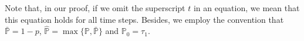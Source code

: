 %
%
Note that, in our proof, if we omit the superscript $t$ in an equation, we mean that this equation holds for all time steps.
Besides, we employ the convention that $\bar{\mathbb{P}}=1-p$, $\hat{\mathbb{P}}=\max \{\mathbb{P}, \bar{\mathbb{P}}\}$ and $\mathbb{P}_0=\tau_1$.

